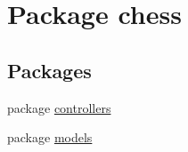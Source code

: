 \hypertarget{namespacechess}{}\section{Package chess}
\label{namespacechess}
\subsection*{Packages}
\begin{DoxyCompactItemize}
\item 
package \mbox{\hyperlink{namespacechess_1_1controllers}{controllers}}
\item 
package \mbox{\hyperlink{namespacechess_1_1models}{models}}
\end{DoxyCompactItemize}

